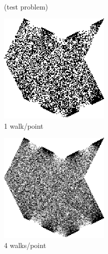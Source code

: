 \documentclass{article}
\newcommand{\figlabel}[1]{\textsf{#1}}
\begin{document}
\begin{figure}[h!]
   \centering
   \begin{minipage}{150pt}
      \centering
       \\
      \figlabel{(test problem)}
   \end{minipage}
   \begin{minipage}{150pt}
      \centering
      \includegraphics[width=150pt]{images/WoSt-1wpp.png} \\
      \figlabel{1 walk/point}
   \end{minipage}
   \begin{minipage}{150pt}
      \centering
      \includegraphics[width=150pt]{images/WoSt-4wpp.png} \\
      \figlabel{4 walks/point}
   \end{minipage}

   \vspace{\baselineskip}


\end{figure}
\end{document}
